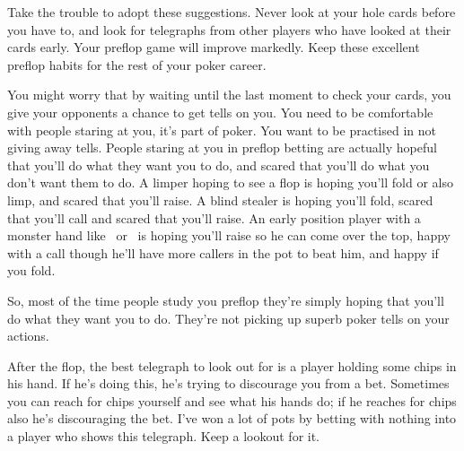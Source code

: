 Take the trouble to adopt these suggestions. Never look at your hole
cards before you have to, and look for telegraphs from other players
who have looked at their cards early. Your preflop game will
improve markedly. Keep these excellent preflop habits
for the rest of your poker career.

You might worry that by waiting until the last moment to check your
cards, you give your opponents a chance to get tells on you.
You need to be comfortable with people staring at you, it's part of
poker. You want to be practised in not giving away tells. People
staring at you in preflop betting are actually hopeful that you'll do
what they want you to do, and scared that you'll do what you don't
want them to do. A limper hoping to see a flop is hoping you'll fold
or also limp, and scared that you'll raise. A blind stealer is hoping
you'll fold, scared that you'll call and scared that you'll
raise. An early position player with a monster hand like \Kc\Ks\ or
\Ad\Kd\ is hoping you'll raise so he can come over the top, happy with
a call though he'll have more callers in the pot to beat him, and
happy if you fold.

So, most of the time people study you preflop they're simply
hoping that you'll do what they want you to do. They're not picking up
superb poker tells on your actions.

After the flop, the best telegraph to look out for is a player
holding some chips in his hand. If he's doing this, he's trying
to discourage you from a bet. Sometimes you can reach for chips
yourself and see what his hands do; if he reaches for chips also
he's discouraging the bet. I've won a lot of pots by betting
with nothing into a player who shows this telegraph. Keep a
lookout for it.

